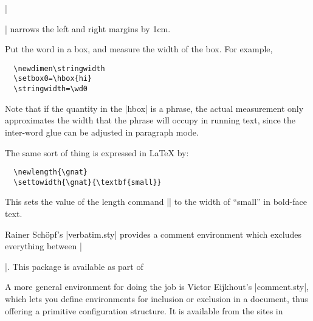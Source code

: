 |\begin{changemargin}{-1cm}{-1cm}| narrows the left and right margins
by 1cm.


Put the word in a box, and measure the width of the box. For example,
\begin{verbatim}
  \newdimen\stringwidth
  \setbox0=\hbox{hi}
  \stringwidth=\wd0
\end{verbatim}
Note that if the quantity in the \cs|hbox| is a phrase, the actual
measurement only approximates the width that the phrase will occupy in
running text, since the inter-word glue can be adjusted in paragraph
mode.

The same sort of thing is expressed in \LaTeX{} by:
\begin{verbatim}
  \newlength{\gnat}
  \settowidth{\gnat}{\textbf{small}}
\end{verbatim}
This sets the value of the length command |\gnat| to the width of ``small''
in bold-face text.


Rainer Sch\"opf's \File|verbatim.sty| provides a comment environment which
excludes everything between |\begin{comment}| and |\end{comment}|. 
This package is available as part of 

A more general environment for doing the job is Victor Eijkhout's
\File|comment.sty|, which lets you define environments for inclusion
or exclusion in a document, thus offering a primitive configuration
structure.  It is available from the  sites in 



\end{changemargin}
